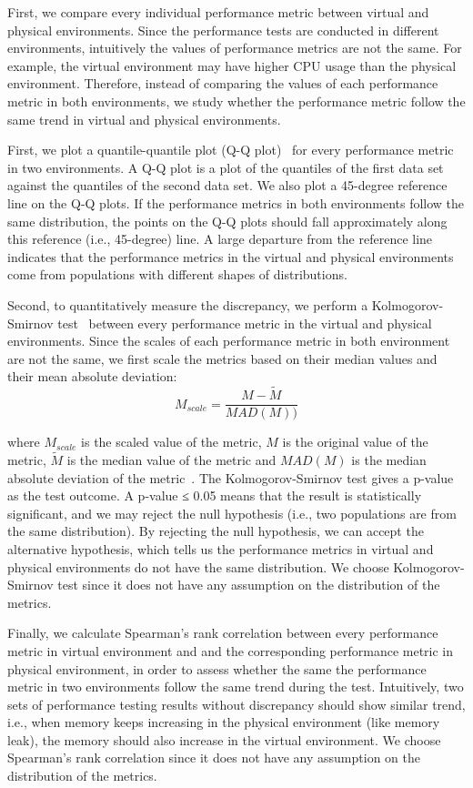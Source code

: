 First, we compare every individual performance metric between virtual and physical environments. Since the performance tests are conducted in different environments, intuitively the values of performance metrics are not the same. For example, the virtual environment may have higher CPU usage than the physical environment. Therefore, instead of comparing the values of each performance metric in both environments, we study whether the performance metric follow the same trend in virtual and physical environments. 

First, we plot a quantile-quantile plot (Q-Q plot)~\cite{qqplots} for every performance metric in two environments. A Q-Q plot is a plot of the quantiles of the first data set against the quantiles of the second data set. We also plot a 45-degree reference line on the Q-Q plots. If the performance metrics in both environments follow the same distribution, the points on the Q-Q plots should fall approximately along this reference (i.e., 45-degree) line. A large departure from the reference line indicates that the performance metrics in the virtual and physical environments come from populations with different shapes of distributions. 

Second, to quantitatively measure the discrepancy, we perform a Kolmogorov-Smirnov test~\cite{kstest} between every performance metric in the virtual and physical environments. Since the scales of each performance metric in both environment are not the same, we first scale the metrics based on their median values and their mean absolute deviation: 
\begin{equation}
	\label{equ:mad}
		M_{scale}=\frac{M-\tilde{M}}{MAD(M))}		
\end{equation}
	
where $M_{scale}$ is the scaled value of the metric, $M$ is the original value of the metric, $\tilde{M}$ is the median value of the metric and $MAD(M)$ is the median absolute deviation of the metric~\cite{walker1929studies}. The Kolmogorov-Smirnov test gives a p-value as the test outcome. A p-value ≤ 0.05 means that the result is statistically significant, and we may reject the null hypothesis (i.e., two populations are from the same distribution). By rejecting the null hypothesis, we can accept the alternative hypothesis, which tells us the performance metrics in virtual and physical environments do not have the same distribution. We choose Kolmogorov-Smirnov test since it does not have any assumption on the distribution of the metrics.

Finally, we calculate Spearman's rank correlation between every performance metric in virtual environment and and the corresponding performance metric in physical environment, in order to assess whether the same the performance metric in two environments follow the same trend during the test. Intuitively, two sets of performance testing results without discrepancy should show similar trend, i.e., when memory keeps increasing in the physical environment (like memory leak), the memory should also increase in the virtual environment. We choose Spearman's rank correlation since it does not have any assumption on the distribution of the metrics. 


